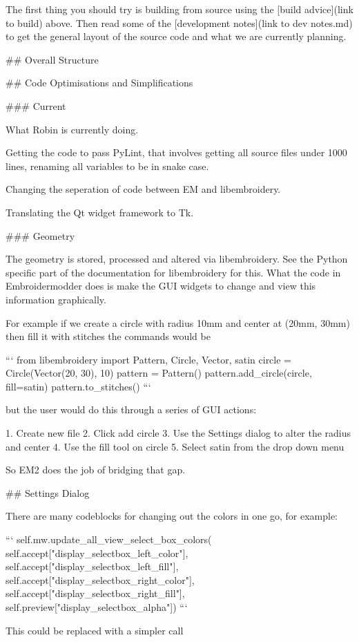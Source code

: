 The first thing you should try is building from source using the [build advice](link to build)
above. Then read some of the [development notes](link to dev notes.md) to get the general
layout of the source code and what we are currently planning.

## Overall Structure

## Code Optimisations and Simplifications

### Current

What Robin is currently doing.

Getting the code to pass PyLint, that involves getting all source files
under 1000 lines, renaming all variables to be in snake case.

Changing the seperation of code between EM and libembroidery.

Translating the Qt widget framework to Tk.

### Geometry

The geometry is stored, processed and altered via libembroidery. See the Python
specific part of the documentation for libembroidery for this. What the code in
Embroidermodder does is make the GUI widgets to change and view this information
graphically.

For example if we create a circle with radius 10mm and center at (20mm, 30mm)
then fill it with stitches the commands would be

```
from libembroidery import Pattern, Circle, Vector, satin
circle = Circle(Vector(20, 30), 10)
pattern = Pattern()
pattern.add_circle(circle, fill=satin)
pattern.to_stitches()
```

but the user would do this through a series of GUI actions:

1. Create new file
2. Click add circle
3. Use the Settings dialog to alter the radius and center
4. Use the fill tool on circle
5. Select satin from the drop down menu

So EM2 does the job of bridging that gap.

## Settings Dialog

There are many codeblocks for changing out the colors in one go, for example:

```
self.mw.update_all_view_select_box_colors(    self.accept["display_selectbox_left_color"],
self.accept["display_selectbox_left_fill"],
self.accept["display_selectbox_right_color"],
self.accept["display_selectbox_right_fill"],
self.preview["display_selectbox_alpha"])
```

This could be replaced with a simpler call

